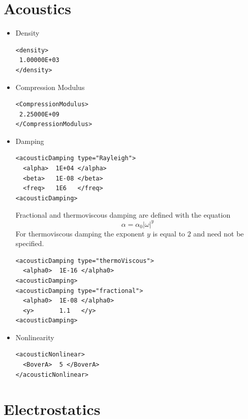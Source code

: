 \section{Acoustics}
\begin{itemize}

\item Density
\begin{verbatim}
<density>
 1.00000E+03 
</density>
\end{verbatim}


\item Compression Modulus
\begin{verbatim}
<CompressionModulus>
 2.25000E+09
</CompressionModulus>
\end{verbatim}


\item Damping
\begin{verbatim}
<acousticDamping type="Rayleigh">
  <alpha>  1E+04 </alpha>
  <beta>   1E-08 </beta>
  <freq>   1E6   </freq>
<acousticDamping>
\end{verbatim}
Fractional and thermoviscous damping are defined with the equation
$$ \alpha = \alpha_0 | \omega |^y  $$ 
For thermoviscous damping the exponent $y$ is equal to $2$ and need not be specified.
\begin{verbatim}
<acousticDamping type="thermoViscous">
  <alpha0>  1E-16 </alpha0>
<acousticDamping>
<acousticDamping type="fractional">
  <alpha0>  1E-08 </alpha0>
  <y>       1.1   </y>
<acousticDamping>
\end{verbatim}

\item Nonlinearity
\begin{verbatim}
<acousticNonlinear>
  <BoverA>  5 </BoverA>
</acousticNonlinear>
\end{verbatim}
\end{itemize}

\section{Electrostatics}

